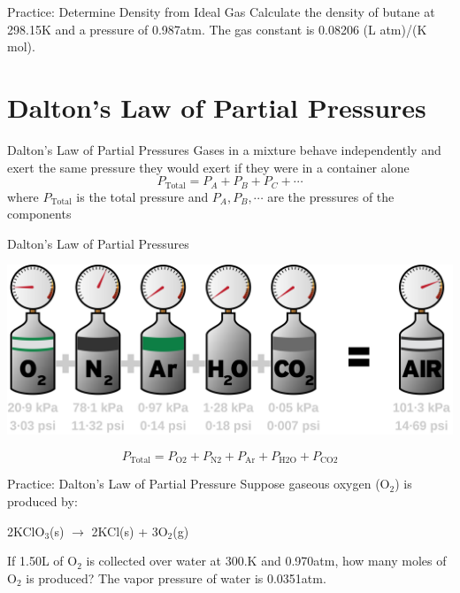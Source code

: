 \documentclass[11pt]{beamer}
\begin{document}
\begin{frame}{Practice: Determine Density from Ideal Gas}
  Calculate the density of butane at 298.15K and a pressure of
  0.987atm. The gas constant is 0.08206 (L atm)/(K mol). %
  \vspace{1.5in}
\end{frame}

\section{Dalton's Law of Partial Pressures}

\begin{frame}{Dalton's Law of Partial Pressures}
  Gases in a mixture behave independently and exert the same pressure they would
  exert if they were in a container alone
  \begin{equation}
    P_\text{Total} = P_A + P_B + P_C + \cdots
  \end{equation}
  where $P_\text{Total}$ is the total pressure and $P_A, P_B, \cdots$ are the
  pressures of the components
\end{frame}

\begin{frame}{Dalton's Law of Partial Pressures}
  \begin{center}
    \includegraphics[width=\linewidth]{dalton_partial}
  \end{center}
  \begin{equation}
    P_\text{Total} = P_\text{O2} + P_\text{N2} + P_\text{Ar}
    + P_\text{H2O} + P_\text{CO2}
    \nonumber
  \end{equation}
\end{frame}

\begin{frame}{Practice: Dalton's Law of Partial Pressure}
  Suppose gaseous oxygen (O$_2$) is produced by:

  2KClO$_3$(s) $\rightarrow$ 2KCl(s) + 3O$_2$(g)

  If 1.50L of O$_2$ is collected over water at 300.K and 0.970atm,
  how many moles of O$_2$ is produced? The vapor pressure of water
  is 0.0351atm.
  \vspace{1.3in}
\end{frame}
\end{document}
